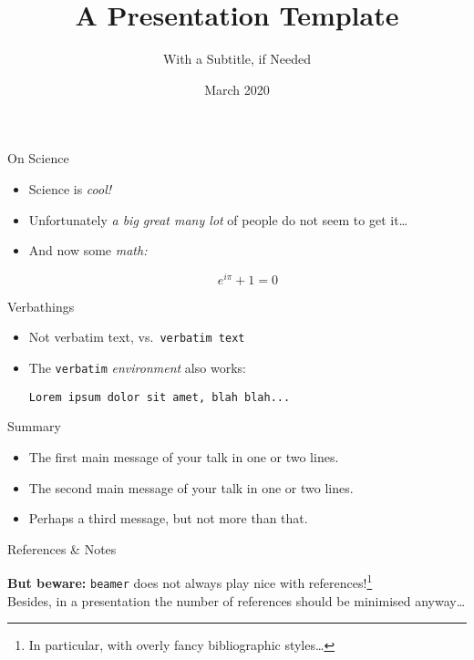 \documentclass{beamer}
\title
{A Presentation Template}
\subtitle
{With a Subtitle, if Needed}
\date
{March 2020}
\begin{document}
\begin{frame}[plain]
  \titlepage
\end{frame}

\begin{frame}{On Science}
  \vfill
  \begin{itemize}
    \item<1-> Science is \emph{cool!} \citep{Sagan}
      \vfill
    \item<2-> Unfortunately \emph{a big great many lot} of people do not seem to get it\dots \citep{Feynman74}
      \vfill
    \item<3-> And now some \emph{math:}
      \vfill
      \begin{theorem} %
        \begin{equation}
          e^{i\pi}+1=0
        \end{equation}
      \end{theorem}
  \end{itemize}
  \vfill
\end{frame}

\begin{frame}[fragile]{Verbathings}
  \begin{itemize}
    \item Not verbatim text, vs.\ \verb+verbatim text+
    \item The \verb+verbatim+ \emph{environment} also works:
      \begin{verbatim}
Lorem ipsum dolor sit amet, blah blah...
      \end{verbatim}
  \end{itemize}
\end{frame}

\begin{frame}{Summary}
  \begin{itemize}
  \item
    The \alert{first main message} of your talk in one or two lines.
  \item
    The \alert{second main message} of your talk in one or two lines.
  \item
    Perhaps a \alert{third message}, but not more than that.
  \end{itemize}
\end{frame}

\begin{frame}{References \& Notes}
  \vfill
  
  
  \vfill
  \vfill
  \textbf{But beware:} \texttt{beamer} does not always play nice with references!\footnote{In particular, with overly fancy bibliographic styles\dots}\\[1em]
  Besides, in a presentation the number of references should be minimised anyway\dots
  \vfill
\end{frame}
\end{document}
